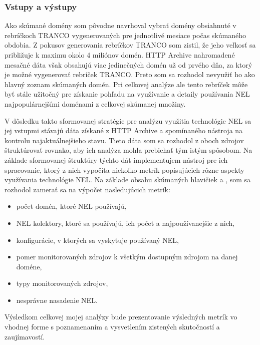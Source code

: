 \subsubsection{Vstupy a výstupy}

Ako skúmané domény som pôvodne navrhoval vybrať domény obsiahnuté v rebríčkoch TRANCO vygenerovaných pre jednotlivé mesiace počas skúmaného obdobia.
Z pokusov generovania rebríčkov TRANCO som zistil, že jeho veľkosť sa približuje k maximu okolo 4 miliónov domén.
HTTP Archive nahromadené mesačné dáta však obsahujú viac jedinečných domén už od prvého dňa, za ktorý je možné vygenerovať rebríček TRANCO.
Preto som sa rozhodol nevyužiť ho ako hlavný zoznam skúmaných domén.
Pri celkovej analýze ale tento rebríček môže byť stále užitočný pre získanie pohľadu na využívanie a detaily používania NEL najpopulárnejšími doménami z celkovej skúmanej množiny.

V dôsledku takto sformovanej stratégie pre analýzu využitia technológie NEL sa jej vstupmi stávajú dáta získané z HTTP Archive a spomínaného nástroja na kontrolu najaktuálnejšieho stavu.
Tieto dáta som sa rozhodol z oboch zdrojov štruktúrovať rovnako, aby ich analýza mohla prebiehať tým istým spôsobom.
Na základe sformovanej štruktúry týchto dát implementujem nástroj pre ich spracovanie, ktorý z nich vypočíta niekoľko metrík popisujúcich rôzne aspekty využívania technológie NEL.
Na základe obsahu skúmaných hlavičiek  a , som sa rozhodol zamerať sa na výpočet nasledujúcich metrík:
\begin{itemize}
    \item počet domén, ktoré NEL používajú,
    \item NEL kolektory, ktoré sa používajú, ich počet a najpoužívanejšie z nich,
    \item konfigurácie, v ktorých sa vyskytuje používaný NEL,
    \item pomer monitorovaných zdrojov k všetkým dostupným zdrojom na danej doméne,
    \item typy monitorovaných zdrojov,
    \item nesprávne nasadenie NEL.
\end{itemize}

Výsledkom celkovej mojej analýzy bude prezentovanie výsledných metrík vo vhodnej forme s poznamenaním a vysvetlením zistených skutočností a zaujímavostí. 

\pagebreak

